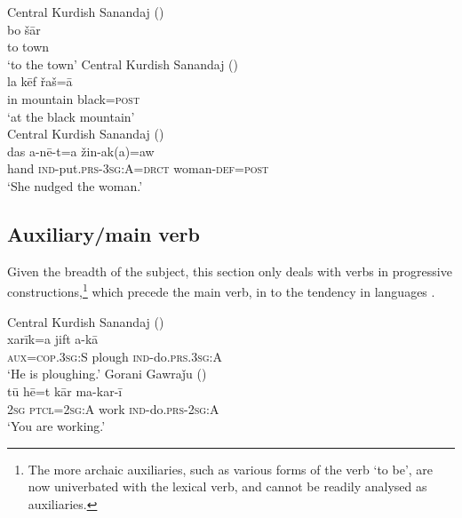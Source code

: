 \documentclass[output=paper,colorlinks,citecolor=brown]{langscibook}
\begin{document}
\begin{sloppypar}
\ea
\ea\label{MGKC:ex:6a}
Central Kurdish Sanandaj (\citealt[B, 0261]{mohammadirad_Sanandaj_Kurdish_2022}) \\
\gll bo šār \\
to town \\
\glt `to the town'
\ex\label{MGKC:ex:6b}
Central Kurdish Sanandaj (\citealt[A, 0010]{mohammadirad_Sanandaj_Kurdish_2022}) \\
\gll la kēf řaš=ā \\
in mountain black=\textsc{post} \\
\glt `at the black mountain' \\
\ex\label{MGKC:ex:6c}
Central Kurdish Sanandaj (\citealt[K, 1160]{mohammadirad_Sanandaj_Kurdish_2022}) \\
\gll das a-nē-t=a žin-ak(a)=aw\\
hand \textsc{ind}-put\textsc{.prs-3sg:A=drct} woman\textsc{-def=post} \\
\glt `She nudged the woman.'
\z
\z 

\subsection{Auxiliary/main verb}
Given the breadth of the subject, this section only deals with  verbs in progressive constructions,\footnote{The more archaic auxiliaries, such as various forms of the verb `to be', are now univerbated with the lexical verb, and cannot be readily analysed as  auxiliaries.} which precede the main verb, in  to the tendency in  languages \citep[][100]{Dryer1992Greeburg}{}{}. 

\ea
\ea\label{MGKC:ex:7a}
Central Kurdish Sanandaj (\citealt[D, 0449]{mohammadirad_Sanandaj_Kurdish_2022}) \\
\gll xarīk=a jift a-kā \\
\textsc{aux=cop.3sg:S} plough \textsc{ind}-do.\textsc{prs.3sg:A} \\
\glt `He is ploughing.'
\ex\label{MGKC:ex:7b}
Gorani Gawraǰu (\citealt[43]{mahmoudveysi_gorani_2012}) \\
\gll tū hē=t kār ma-kar-ī \\
\textsc{2sg} \textsc{ptcl=2sg:A} work \textsc{ind}-do\textsc{.prs-2sg:A} \\
\glt `You are working.' \\
\z
\z 


\end{sloppypar}
\end{document}
